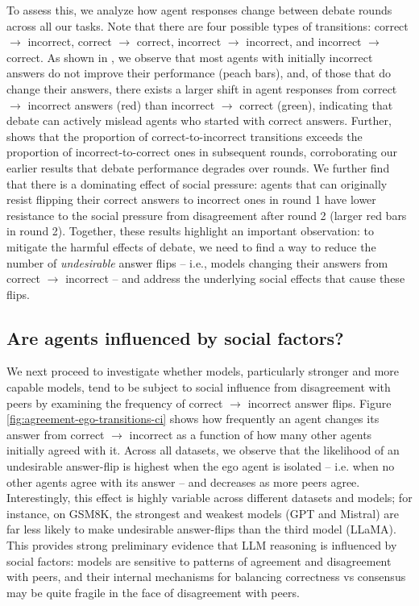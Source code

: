 \documentclass{article}
\begin{document}
To assess this, we analyze how agent responses change between debate rounds across all our tasks. Note that there are four possible types of transitions: correct $\rightarrow$ incorrect, correct $\rightarrow$ correct, incorrect $\rightarrow$ incorrect, and incorrect $\rightarrow$ correct. As shown in , we observe that most agents with initially incorrect answers do not improve their performance (peach bars), and, of those that do change their answers, there exists a larger shift in agent responses from correct $\rightarrow$ incorrect answers (red) than incorrect $\rightarrow$ correct (green), indicating that debate can actively mislead agents who started with correct answers. 
Further,  shows that the proportion of correct-to-incorrect transitions exceeds the proportion of incorrect-to-correct ones in subsequent rounds, corroborating our earlier results that debate performance degrades over rounds. We further find that there is a dominating effect of social pressure: agents that can originally resist flipping their correct answers to incorrect ones in round 1 have lower resistance to the social pressure from disagreement after round 2 (larger red bars in round 2). Together, these results highlight an important observation: to mitigate the harmful effects of debate, we need to find a way to reduce the number of \textit{undesirable} answer flips -- i.e., models changing their answers from correct $\rightarrow$ incorrect -- and address the underlying social effects that cause these flips. 

\subsection{Are agents influenced by social factors?}
\label{sec:social-factors}

We next proceed to investigate whether models, particularly stronger and more capable models, tend to be subject to social influence from disagreement with peers by examining the frequency of correct $\rightarrow$ incorrect answer flips. Figure \ref{fig:agreement-ego-transitions-ci} shows how frequently an agent changes its answer from correct $\rightarrow$ incorrect as a function of how many other agents initially agreed with it. Across all datasets, we observe that the likelihood of an undesirable answer-flip is highest when the ego agent is isolated -- i.e. when no other agents agree with its answer -- and decreases as more peers agree. Interestingly, this effect is highly variable across different datasets and models; for instance, on GSM8K, the strongest and weakest models (GPT and Mistral) are far less likely to make undesirable answer-flips than the third model (LLaMA). This provides strong preliminary evidence that LLM reasoning is influenced by social factors: models are sensitive to patterns of agreement and disagreement with peers, and their internal mechanisms for balancing correctness vs consensus may be quite fragile in the face of disagreement with peers. 
\end{document}
